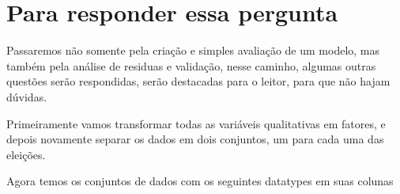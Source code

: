 \documentclass[]{article}
\newenvironment{Shaded}{\begin{snugshade}}{\end{snugshade}}
\newcommand{\KeywordTok}[1]{\textcolor[rgb]{0.13,0.29,0.53}{\textbf{#1}}}
\newcommand{\DataTypeTok}[1]{\textcolor[rgb]{0.13,0.29,0.53}{#1}}
\newcommand{\DecValTok}[1]{\textcolor[rgb]{0.00,0.00,0.81}{#1}}
\newcommand{\StringTok}[1]{\textcolor[rgb]{0.31,0.60,0.02}{#1}}
\newcommand{\OperatorTok}[1]{\textcolor[rgb]{0.81,0.36,0.00}{\textbf{#1}}}
\newcommand{\NormalTok}[1]{#1}
\begin{document}
\section{Para responder essa
pergunta}\label{para-responder-essa-pergunta}

Passaremos não somente pela criação e simples avaliação de um modelo,
mas também pela análise de residuas e validação, nesse caminho, algumas
outras questões serão respondidas, serão destacadas para o leitor, para
que não hajam dúvidas.

Primeiramente vamos transformar todas as variáveis qualitativas em
fatores, e depois novamente separar os dados em dois conjuntos, um para
cada uma das eleições.

\begin{Shaded}
\end{Shaded}

Agora temos os conjuntos de dados com os seguintes datatypes em suas
colunas

\begin{Shaded}
\end{Shaded}
\end{document}
